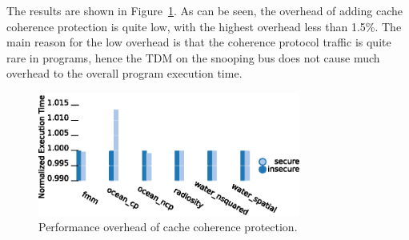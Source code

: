 The results are shown in Figure~\ref{fig:splash2}. As can be seen, the overhead 
of adding cache coherence protection is
quite low, with the highest overhead less than 1.5\%. 
The main reason for the low overhead is that the coherence protocol traffic 
is quite rare in programs, hence the TDM on the
snooping bus does not cause much overhead to the overall program execution 
time.

\begin{figure}
    \begin{center}
        \includegraphics[width=3.4in]{figs/SPLASH.eps}
        \caption{Performance overhead of cache coherence protection.}
        \label{fig:splash2}
    \end{center}
\end{figure}
